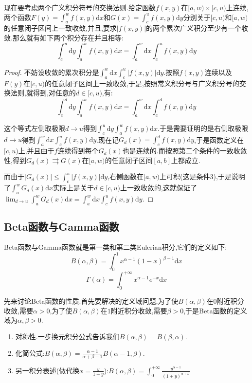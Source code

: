 现在要考虑两个广义积分符号的交换法则.给定函数$f(x,y)$在$[a,w)\times[c,u)$上连续,两个函数$F(y)=\int_a^wf(x,y)\mathrm{d}x$和$G(x)=\int_c^uf(x,y)\mathrm{d}y$分别关于$[c,u)$和$[a,w)$的任意闭子区间上一致收敛,并且,要求$|f(x,y)|$的两个累次广义积分至少有一个收敛.那么就有如下两个积分存在并且相等:
$$\int_c^u\mathrm{d}y\int_a^wf(x,y)\mathrm{d}x=\int_a^w\mathrm{d}x\int_c^uf(x,y)\mathrm{d}y$$
\begin{proof}
	
	不妨设收敛的累次积分是$\int_a^w\mathrm{d}x\int_c^u|f(x,y)|\mathrm{d}y$.按照$f(x,y)$连续以及$F(y)$在$[c,u)$的任意闭子区间上一致收敛,于是,按照常义积分号与广义积分号的交换法则,就得到,对任意的$d\in[c,u)$,有:
	$$\int_c^d\mathrm{d}y\int_a^wf(x,y)\mathrm{d}x=\int_a^w\mathrm{d}x\int_c^df(x,y)\mathrm{d}y$$
	
	这个等式左侧取极限$d\to u$得到$\int_c^u\mathrm{d}y\int_a^wf(x,y)\mathrm{d}x$.于是需要证明的是右侧取极限$d\to u$得到$\int_a^w\mathrm{d}x\int_c^uf(x,y)\mathrm{d}y$.现在记$G_d(x)=\int_c^df(x,y)\mathrm{d}y$,于是函数定义在$[c,u)$上,并且由于$f$连续得到每个$G_d(x)$也是连续的.而按照第二个条件的一致收敛性,得到$G_d(x)\rightrightarrows G(x)$在$[a,w)$的任意闭子区间$[a,b]$上都成立.
	
	而由于$|G_d(x)|\le\int_c^u|f(x,y)|\mathrm{d}y$,右侧函数在$[a,w)$上可积(这是条件3),于是说明了$\int_a^wG_d(x)\mathrm{d}x$实际上是关于$d\in[c,u)$上一致收敛的,这就保证了$\lim_{d\to u}\int_a^wG_d(x)\mathrm{d}x=\int_a^w\mathrm{d}x\int_c^uf(x,y)\mathrm{d}y$.
	
\end{proof}
\newpage
\subsection{Beta函数与Gamma函数}

Beta函数与Gamma函数就是第一类和第二类Eulerian积分,它们的定义如下:
$$B(\alpha,\beta)=\int_0^1x^{\alpha-1}(1-x)^{\beta-1}\mathrm{d}x$$
$$\Gamma(\alpha)=\int_0^{+\infty}x^{\alpha-1}e^{-x}\mathrm{d}x$$

先来讨论Beta函数的性质.首先要解决的定义域问题,为了使$B(\alpha,\beta)$在$0$附近积分收敛,需要$\alpha>0$,为了使$B(\alpha,\beta)$在$1$附近积分收敛,需要$\beta>0$,于是Beta函数的定义域为$\alpha,\beta>0$.

\begin{enumerate}
	\item 对称性.一步换元积分公式告诉我们$B(\alpha,\beta)=B(\beta,\alpha)$.
	\item 化简公式:$B(\alpha,\beta)=\frac{\alpha-1}{\alpha+\beta-1}B(\alpha-1,\beta)$.
	\item 另一积分表述(做代换$x=\frac{y}{1+y}$):$B(\alpha,\beta)=\int_0^{+\infty}\frac{y^{\alpha-1}}{(1+y)^{\alpha+\beta}}$
\end{enumerate}

